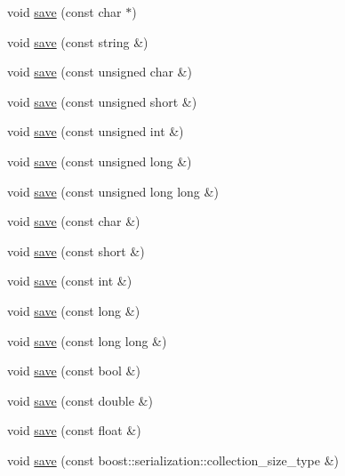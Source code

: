 \begin{DoxyCompactItemize}
\item 
void \hyperlink{classxtd_1_1servers_1_1app_1_1HtmlOArchive_a25bc0aa46ecbc81d01e50e318d85136f}{save} (const char $\ast$)
\item 
void \hyperlink{classxtd_1_1servers_1_1app_1_1HtmlOArchive_ab4a02b5763b656039665add3da76d56f}{save} (const string \&)
\item 
void \hyperlink{classxtd_1_1servers_1_1app_1_1HtmlOArchive_ac34aa74161df424b2a19e41b0c405c25}{save} (const unsigned char \&)
\item 
void \hyperlink{classxtd_1_1servers_1_1app_1_1HtmlOArchive_ac86a79783a5ca046d5eda24a9e6fc558}{save} (const unsigned short \&)
\item 
void \hyperlink{classxtd_1_1servers_1_1app_1_1HtmlOArchive_a5d426b7d61941d71ca43730cdb055055}{save} (const unsigned int \&)
\item 
void \hyperlink{classxtd_1_1servers_1_1app_1_1HtmlOArchive_a4082468458d3b4966bb75d4b92f0d476}{save} (const unsigned long \&)
\item 
void \hyperlink{classxtd_1_1servers_1_1app_1_1HtmlOArchive_a146b049587fa8d292fb9f90f3e23f59b}{save} (const unsigned long long \&)
\item 
void \hyperlink{classxtd_1_1servers_1_1app_1_1HtmlOArchive_a70c1e6b78feb34413275e208fd043964}{save} (const char \&)
\item 
void \hyperlink{classxtd_1_1servers_1_1app_1_1HtmlOArchive_a7dd264fc7222a8689764f4d8ab5c033b}{save} (const short \&)
\item 
void \hyperlink{classxtd_1_1servers_1_1app_1_1HtmlOArchive_af94e2907eba4d436906dc61f57459cd3}{save} (const int \&)
\item 
void \hyperlink{classxtd_1_1servers_1_1app_1_1HtmlOArchive_a2e99b889f990c3fa26b24b6ca1684265}{save} (const long \&)
\item 
void \hyperlink{classxtd_1_1servers_1_1app_1_1HtmlOArchive_addee578d18549c53b00e4c676a568c25}{save} (const long long \&)
\item 
void \hyperlink{classxtd_1_1servers_1_1app_1_1HtmlOArchive_a468a544e41a404c35321f89b1d4cb59c}{save} (const bool \&)
\item 
void \hyperlink{classxtd_1_1servers_1_1app_1_1HtmlOArchive_a5e14af7ab3311cf61fafe8b2742e22be}{save} (const double \&)
\item 
void \hyperlink{classxtd_1_1servers_1_1app_1_1HtmlOArchive_ab9f8811eb20eb372e6cabfa328d2ccf6}{save} (const float \&)
\item 
void \hyperlink{classxtd_1_1servers_1_1app_1_1HtmlOArchive_a9029ddca116a4a843ec6668d1bc3fc90}{save} (const boost\+::serialization\+::collection\+\_\+size\+\_\+type \&)

\end{DoxyCompactItemize}
